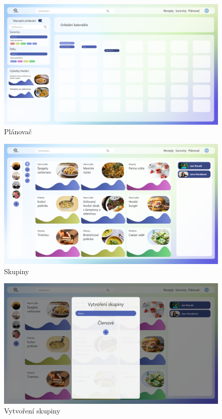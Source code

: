 \begin{figure}[H]
    \includegraphics[width=\textwidth]{pdf/adobexd/planovac}
    \caption{Plánovač} \label{picture:recipeo:navrh:planovac}
\end{figure}
\vspace*{\fill}

\vspace*{\fill}
\begin{figure}[H]
    \includegraphics[width=\textwidth]{pdf/adobexd/skupiny}
    \caption{Skupiny} \label{picture:recipeo:navrh:skupiny}
\end{figure}

\begin{figure}[H]
    \includegraphics[width=\textwidth]{pdf/adobexd/skupiny-vytvoreni}
    \caption{Vytvoření skupiny} \label{picture:recipeo:navrh:skupiny-vytvoreni}
\end{figure}
\vspace*{\fill}

